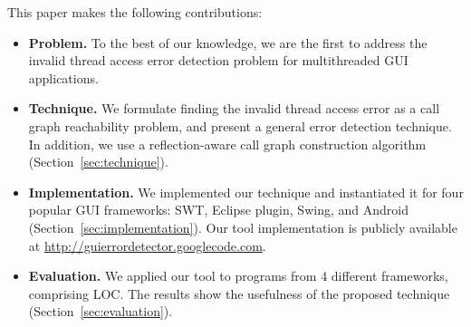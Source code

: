 This paper makes the following contributions:

\vspace{-5pt}

\tinystep

\begin{itemize}
\item \textbf{Problem.} To the best of our knowledge, we are the first to address
the invalid thread access error detection problem for multithreaded GUI applications.

\tinystep

\item \textbf{Technique.} We formulate finding
the invalid thread access error as a call graph reachability problem,
and present a general error detection technique.
In addition, we use a reflection-aware
call graph construction algorithm (Section~\ref{sec:technique}).

\tinystep

\item \textbf{Implementation.} We implemented our technique and
instantiated it for four
popular GUI frameworks: SWT, Eclipse plugin, Swing, and Android (Section~\ref{sec:implementation}). Our
tool implementation is publicly available at
{\smaller\url{http://guierrordetector.googlecode.com}}.

\tinystep

\item \textbf{Evaluation.} We applied our tool to \subnum programs 
from 4 different frameworks, comprising \totaloc LOC. The results
show the usefulness of the proposed technique (Section~\ref{sec:evaluation}).

\end{itemize}

